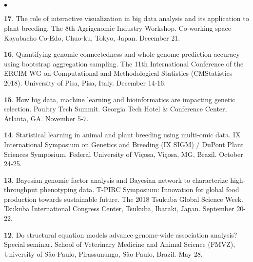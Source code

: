 \documentclass[margin,line,10pt]{res}
\newenvironment{list2}{
  \begin{list}{$\bullet$}{%
      \setlength{\itemsep}{0in}
      \setlength{\parsep}{0in} \setlength{\parskip}{0in}
      \setlength{\topsep}{0in} \setlength{\partopsep}{0in} 
      \setlength{\leftmargin}{0.2in}}}{\end{list}}
\begin{document}
\begin{resume}
\section{}
\begin{list2}

  \item [{\bf 17}.] The role of interactive visualization in big data analysis and its application to plant breeding. The 8th Agrigenomic Industry Workshop. Co-working space Kayabacho Co-Edo, Chuo-ku, Tokyo, Japan. December 21.

    \vspace{0.5cm}
    
   \item [{\bf 16}.] Quantifying genomic connectedness and whole-genome prediction accuracy using bootstrap aggregation sampling. The 11th International Conference of the ERCIM WG on Computational and Methodological Statistics (CMStatistics 2018). University of Pisa, Pisa, Italy. December 14-16.

     \vspace{0.5cm}
     
    \item [{\bf 15}.] How big data, machine learning and bioinformatics are impacting genetic selection. Poultry Tech Summit. Georgia Tech Hotel \& Conference Center, Atlanta, GA. November 5-7.

      \vspace{0.5cm}
      
  \item [{\bf 14}.] Statistical learning in animal and plant breeding using multi-omic data. IX International Symposium on Genetics and Breeding (IX SIGM) / DuPont Plant Sciences Symposium.  Federal University of Vi\c cosa, Vi\c cosa, MG, Brazil. October 24-25.
  
  
  \vspace{0.5cm}
  
\item [{\bf 13}.] Bayesian genomic factor analysis and Bayesian network to characterize high-throughput phenotyping data. T-PIRC Symposium: Innovation for global food production towards sustainable future. The 2018 Tsukuba Global Science Week. Tsukuba International Congress Center, Tsukuba, Ibaraki, Japan. September 20-22.
  

  \vspace{0.5cm}
  
  
\item [{\bf 12}.] Do structural equation models advance genome-wide association analysis? Special seminar. School of Veterinary Medicine and Animal Science (FMVZ), University of S\~{a}o Paulo, Pirassununga, S\~{a}o Paulo, Brazil.  May 28.


\end{list2}
\end{resume}
\end{document}
